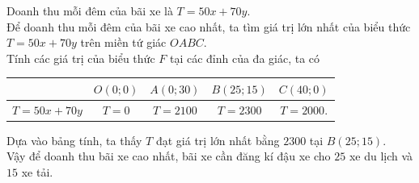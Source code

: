 \begin{ex}
{{
		}
		\noindent Doanh thu mỗi đêm của bãi xe là $T=50x+70y$.\\
		Để doanh thu mỗi đêm của bãi xe cao nhất, ta tìm giá trị lớn nhất của biểu thức $T=50x+70y$ trên miền tứ giác $OABC$.\\
		Tính các giá trị của biểu thức $F$ tại các đỉnh của đa giác, ta có
		\begin{center}
			\begin{longtable}{|c|c|c|c|c|}
				\hline
				& $O(0;0)$& $A(0;30)$& $B(25;15)$& $C(40;0)$\\
				\hline
				$T=50x+70y$& $T=0$ & $T=2100$ &$T=2300$ & $T=2000$.\\
				\hline
			\end{longtable}
		\end{center}
		Dựa vào bảng tính, ta thấy $T$ đạt giá trị lớn nhất bằng $2300$ tại $B(25;15)$.\\
		Vậy để doanh thu bãi xe cao nhất, bãi xe cần đăng kí đậu xe cho $25$ xe du lịch và $15$ xe tải.		
	}
\end{ex}

